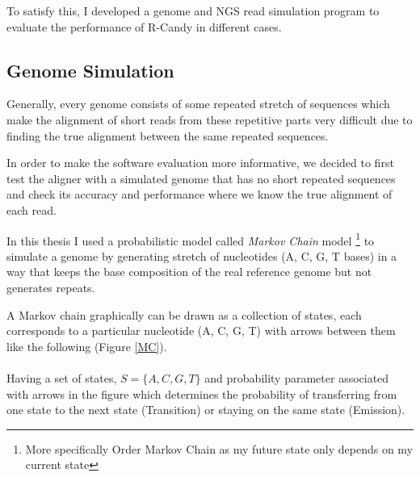 \documentclass[11pt,a4paper]{report}
\begin{document}
To satisfy this, I developed a genome and NGS read simulation program to evaluate 
the performance of R-Candy in different cases.



\subsection{Genome Simulation} 
\label{ Genome Simulation }

Generally, every genome consists of some repeated stretch of sequences which make 
the alignment of short reads from these repetitive parts very difficult due to 
finding the true alignment between the same repeated sequences.

In order to make the software evaluation more informative, we decided to first 
test the aligner with a simulated genome that has no short repeated sequences 
and check its accuracy and performance where we know the true alignment of each 
read.

In this thesis I used a probabilistic model called \emph{Markov Chain} model 
\footnote{More specifically  Order Markov Chain as my future state only 
depends on my current state} to simulate a genome by generating stretch of 
nucleotides (A, C, G, T bases) in a way that  keeps the base composition of the 
real reference genome but not generates repeats.
 
 
A Markov chain graphically can be drawn as a collection of states, 
each corresponds to a particular nucleotide (A, C, G, T) with arrows
between them like the following (Figure \ref{MC}). 
\\\\ 
Having a set of states,  $ S= \{ A, C,  G, T \}$  and probability
parameter  associated with arrows in the figure which determines the
probability of transferring from one state to the next state (Transition)
or staying on the same state (Emission).
\end{document}
